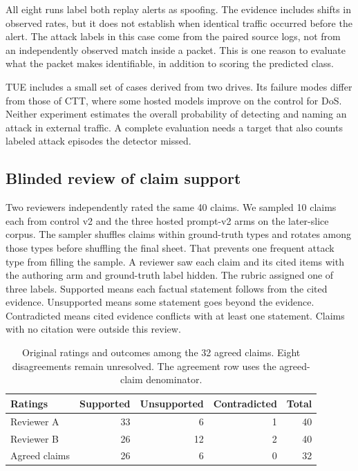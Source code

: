 \documentclass[sigconf,pbalance=true]{acmart}
\begin{document}
All eight runs label both replay alerts as spoofing. The evidence includes shifts in observed rates, but it does not establish when identical traffic occurred before the alert. The attack labels in this case come from the paired source logs, not from an independently observed match inside a packet. This is one reason to evaluate what the packet makes identifiable, in addition to scoring the predicted class.

TUE includes a small set of cases derived from two drives. Its failure modes differ from those of CTT, where some hosted models improve on the control for DoS. Neither experiment estimates the overall probability of detecting and naming an attack in external traffic. A complete evaluation needs a target that also counts labeled attack episodes the detector missed.

\subsection{Blinded review of claim support}

Two reviewers independently rated the same 40 claims. We sampled 10 claims each from control v2 and the three hosted prompt-v2 arms on the later-slice corpus. The sampler shuffles claims within ground-truth types and rotates among those types before shuffling the final sheet. That prevents one frequent attack type from filling the sample. A reviewer saw each claim and its cited items with the authoring arm and ground-truth label hidden. The rubric assigned one of three labels. Supported means each factual statement follows from the cited evidence. Unsupported means some statement goes beyond the evidence. Contradicted means cited evidence conflicts with at least one statement. Claims with no citation were outside this review.

\begin{table}[t]
  \caption{Original ratings and outcomes among the 32 agreed claims. Eight disagreements remain unresolved. The agreement row uses the agreed-claim denominator.}
  \label{tab:review}
  \small
  \centering
  \begin{tabular}{@{}lrrrr@{}}
  \toprule
  Ratings & Supported & Unsupported & Contradicted & Total \\
  \midrule
  Reviewer A & 33 & 6 & 1 & 40 \\
  Reviewer B & 26 & 12 & 2 & 40 \\
  Agreed claims & 26 & 6 & 0 & 32 \\
  \bottomrule
  \end{tabular}
\end{table}
\end{document}
